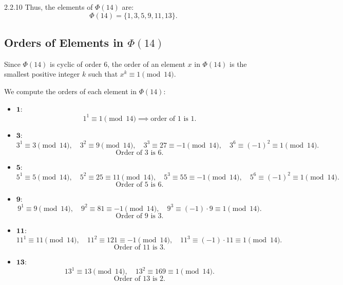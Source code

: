 \documentclass[12pt]{amsart}
\theoremstyle{definition}
\numberwithin{equation}{section}
\begin{document}
\begin{exercise}{2.2.10}
    Thus, the elements of \(\Phi(14)\) are:
    \[
    \Phi(14) = \{1, 3, 5, 9, 11, 13\}.
    \]
    \newpage
    \subsection*{Orders of Elements in \(\Phi(14)\)}
    
    Since \(\Phi(14)\) is cyclic of order 6, the order of an element \(x\) in \(\Phi(14)\) is the smallest positive integer \(k\) such that \(x^k \equiv 1 \pmod{14}\).
    
    We compute the orders of each element in \(\Phi(14)\):
    
    \begin{itemize}[label=--]
        \item \(\mathbf{1}\):
        \[
        1^1 \equiv 1 \pmod{14} \implies \text{order of } 1 \text{ is } 1.
        \]
    
        \item \(\mathbf{3}\):
        \[
        3^1 \equiv 3 \pmod{14}, \quad 3^2 \equiv 9 \pmod{14}, \quad 3^3 \equiv 27 \equiv -1 \pmod{14}, \quad 3^6 \equiv (-1)^2 \equiv 1 \pmod{14}.
        \]
        \[
        \text{Order of } 3 \text{ is } 6.
        \]
    
        \item \(\mathbf{5}\):
        \[
        5^1 \equiv 5 \pmod{14}, \quad 5^2 \equiv 25 \equiv 11 \pmod{14}, \quad 5^3 \equiv 55 \equiv -1 \pmod{14}, \quad 5^6 \equiv (-1)^2 \equiv 1 \pmod{14}.
        \]
        \[
        \text{Order of } 5 \text{ is } 6.
        \]
    
        \item \(\mathbf{9}\):
        \[
        9^1 \equiv 9 \pmod{14}, \quad 9^2 \equiv 81 \equiv -1 \pmod{14}, \quad 9^3 \equiv (-1) \cdot 9 \equiv 1 \pmod{14}.
        \]
        \[
        \text{Order of } 9 \text{ is } 3.
        \]
    
        \item \(\mathbf{11}\):
        \[
        11^1 \equiv 11 \pmod{14}, \quad 11^2 \equiv 121 \equiv -1 \pmod{14}, \quad 11^3 \equiv (-1) \cdot 11 \equiv 1 \pmod{14}.
        \]
        \[
        \text{Order of } 11 \text{ is } 3.
        \]
    
        \item \(\mathbf{13}\):
        \[
        13^1 \equiv 13 \pmod{14}, \quad 13^2 \equiv 169 \equiv 1 \pmod{14}.
        \]
        \[
        \text{Order of } 13 \text{ is } 2.
        \]
    \end{itemize}
    

\end{exercise}
\end{document}
